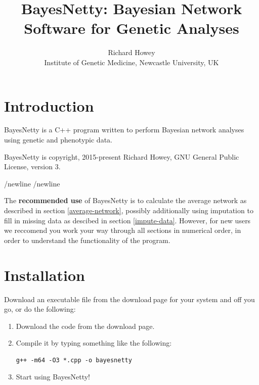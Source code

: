 \documentclass[a4paper,12pt]{article}
\begin{document}
\title{BayesNetty: Bayesian Network Software for Genetic Analyses}
\date{}
\author{Richard Howey\\Institute of Genetic Medicine, Newcastle University, UK}
\maketitle
\newpage
\tableofcontents
\newpage
\section{Introduction}
\label{introduction}

BayesNetty is a C++ program written to perform Bayesian network analyses using genetic and phenotypic data. 

BayesNetty is copyright, 2015-present Richard Howey, GNU General Public License, version 3. 

/newline /newline

The {\bf recommended use} of BayesNetty is to calculate the average network as described in  section \ref{average-network}, possibly additionally using imputation to fill in missing data as descibed in  section \ref{impute-data}. However, for new users we reccomend you work your way through all sections in numerical order, in order to understand the functionality of the program. 


\section{Installation}
\label{installation}

Download an executable file from the download$\:$page for your system and off you go, or do the following: 
\begin{enumerate}

\item Download the code from the download page. 
\item Compile it by typing something like the following: \vspace{0.35cm} \begin{lstlisting}
g++ -m64 -O3 *.cpp -o bayesnetty 
\end{lstlisting} \vspace{0.35cm}
\item Start using BayesNetty!\end{enumerate}

\end{document}
